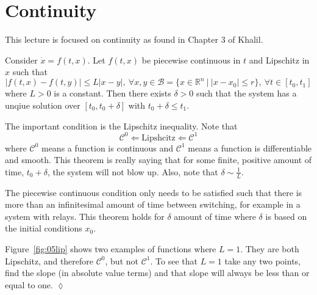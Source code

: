 
\mainmatter%
\setcounter{page}{1}

\lectureseries[\course]{\course}

\date{January 19, 2010}

\setaddress%

\setcounter{lecture}{4}
\setcounter{chapter}{4}


\section{Continuity}
This lecture is focused on continuity as found in Chapter 3 of Khalil.

\begin{theorem}
\label{th:05lip}
Consider $\dot{x} = f(t,x)$. Let $f(t,x)$ be piecewise continuous in $t$ and Lipschitz in $x$ such that
$$|f(t,x) - f(t,y)| \leq L|x-y|,~\forall x,y\in\mathcal{B} = \{x\in\mathbb{R}^n~|~|x-x_0|\leq r\},~\forall t\in[t_0,t_1]$$
where $L>0$ is a constant. Then there exists $\delta>0$ such that the system has a unqiue solution over $[t_0,t_0+\delta]$ with $t_0+\delta\leq t_1$.
\end{theorem}

The important condition is the Lipschitz inequality. Note that
$$\mathcal{C}^0 \Leftarrow \text{Lipshcitz} \Leftarrow \mathcal{C}^1$$
where $\mathcal{C}^0$ means a function is continuous and $\mathcal{C}^1$ means a function is differentiable and smooth. This theorem is really saying that for some finite, positive amount of time, $t_0+\delta$, the system will not blow up. Also, note that $\delta\sim\frac{1}{L}$.

The piecewise continuous condition only needs to be satisfied such that there is more than an infinitesimal amount of time between switching, for example in a system with relays. This theorem holds for $\delta$ amount of time where $\delta$ is based on the initial conditions $x_0$.

\begin{example}
Figure~\ref{fig:05lip} shows two examples of functions where $L=1$. They are both Lipschitz, and therefore $\mathcal{C}^0$, but not $\mathcal{C}^1$. To see that $L=1$ take any two points, find the slope (in absolute value terms) and that slope will always be less than or equal to one.
$\lozenge$
\end{example}

